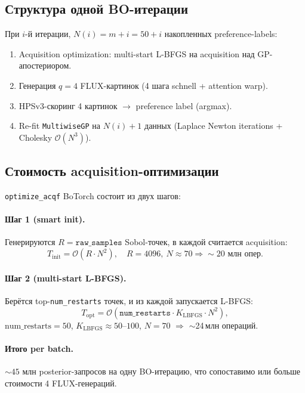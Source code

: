 \documentclass[11pt,a4paper]{article}
\begin{document}
\subsection{Структура одной BO-итерации}

При $i$-й итерации, $N(i) = m + i = 50 + i$ накопленных preference-labels:
\begin{enumerate}[leftmargin=2em,itemsep=2pt]
  \item Acquisition optimization: multi-start L-BFGS на acquisition
        над GP-апостериором.
  \item Генерация $q=4$ FLUX-картинок (4 шага schnell + attention warp).
  \item HPSv3-скоринг 4 картинок $\to$ preference label (argmax).
  \item Re-fit \texttt{MultiwiseGP} на $N(i)+1$ данных
        (Laplace Newton iterations + Cholesky $\mathcal{O}(N^3)$).
\end{enumerate}

\subsection{Стоимость acquisition-оптимизации}

\texttt{optimize\_acqf} BoTorch состоит из двух шагов:

\paragraph{Шаг 1 (smart init).} Генерируются $R = \mathtt{raw\_samples}$
Sobol-точек, в каждой считается acquisition:
\[
  T_\text{init} = \mathcal{O}(R \cdot N^2),
  \quad R = 4096,\ N \approx 70 \Rightarrow \sim 20 \text{ млн опер.}
\]

\paragraph{Шаг 2 (multi-start L-BFGS).} Берётся top-\texttt{num\_restarts}
точек, и из каждой запускается L-BFGS:
\[
  T_\text{opt} = \mathcal{O}(\mathtt{num\_restarts}
                       \cdot K_\text{LBFGS} \cdot N^2),
\]
$\text{num\_restarts}=50$, $K_\text{LBFGS}\!\approx\!50\text{--}100$,
$N=70$ $\Rightarrow$ $\sim$24\,млн операций.

\paragraph{Итого per batch.} $\sim 45$ млн posterior-запросов на одну
BO-итерацию, что сопоставимо или больше стоимости 4 FLUX-генераций.
\end{document}
